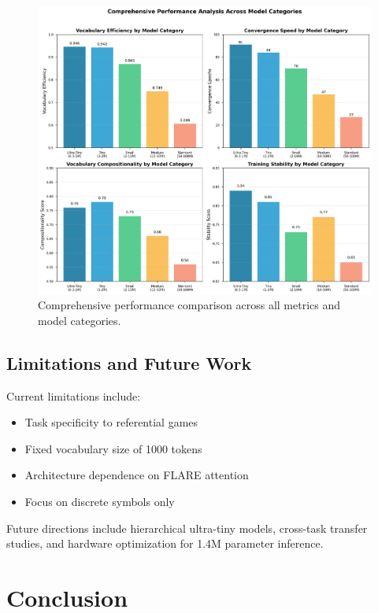 \documentclass[10pt,twocolumn]{article}
\begin{document}
\begin{figure}[h]
    \centering
    \includegraphics[width=\columnwidth]{figures/comprehensive_comparison.png}
    \caption{Comprehensive performance comparison across all metrics and model categories.}
    \label{fig:comprehensive}
\end{figure}

\subsection{Limitations and Future Work}

Current limitations include:
\begin{itemize}
    \item Task specificity to referential games
    \item Fixed vocabulary size of 1000 tokens
    \item Architecture dependence on FLARE attention
    \item Focus on discrete symbols only
\end{itemize}

Future directions include hierarchical ultra-tiny models, cross-task transfer studies, and hardware optimization for 1.4M parameter inference.

\section{Conclusion}
\end{document}
